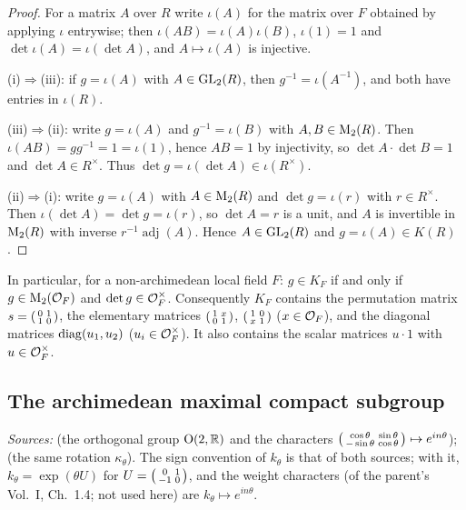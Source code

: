 \begin{lemma}[membership in $K(R)$]
\end{lemma}
\begin{proof}
For a matrix $A$ over $R$ write $\iota(A)$ for the matrix over $F$ obtained by applying $\iota$ entrywise; then
$\iota(AB)=\iota(A)\iota(B)$, $\iota(1)=1$ and $\det\iota(A)=\iota(\det A)$, and $A\mapsto\iota(A)$ is injective.

(i)$\Rightarrow$(iii): if $g=\iota(A)$ with $A\in\mathrm{GL}_2(R)$, then $g^{-1}=\iota(A^{-1})$, and both have entries
in $\iota(R)$.

(iii)$\Rightarrow$(ii): write $g=\iota(A)$ and $g^{-1}=\iota(B)$ with $A,B\in\mathrm{M}_2(R)$. Then
$\iota(AB)=gg^{-1}=1=\iota(1)$, hence $AB=1$ by injectivity, so $\det A\cdot\det B=1$ and $\det A\in R^\times$. Thus
$\det g=\iota(\det A)\in\iota(R^\times)$.

(ii)$\Rightarrow$(i): write $g=\iota(A)$ with $A\in\mathrm{M}_2(R)$ and $\det g=\iota(r)$ with $r\in R^\times$. Then
$\iota(\det A)=\det g=\iota(r)$, so $\det A=r$ is a unit, and $A$ is invertible in $\mathrm{M}_2(R)$ with inverse
$r^{-1}\operatorname{adj}(A)$. Hence $A\in\mathrm{GL}_2(R)$ and $g=\iota(A)\in K(R)$.
\end{proof}
\noindent In particular, for a non-archimedean local field $F$: $g\in K_F$ if and only if $g\in\mathrm{M}_2(\mathcal{O}_F)$ and
$\det g\in\mathcal{O}_F^\times$. Consequently $K_F$ contains the permutation matrix
$s=\begin{psmallmatrix}0&1\\1&0\end{psmallmatrix}$, the elementary matrices
$\begin{psmallmatrix}1&x\\0&1\end{psmallmatrix}$, $\begin{psmallmatrix}1&0\\x&1\end{psmallmatrix}$ ($x\in\mathcal{O}_F$),
and the diagonal matrices $\operatorname{diag}(u_1,u_2)$ ($u_i\in\mathcal{O}_F^\times$). It also contains the scalar matrices $u\cdot1$
with $u\in\mathcal{O}_F^\times$.

\subsection*{The archimedean maximal compact subgroup}

\noindent\emph{Sources:} \cite[§5]{JL} (the orthogonal group $\mathrm{O}(2,\mathbb{R})$ and the characters
$\begin{psmallmatrix}\cos\theta&\sin\theta\\-\sin\theta&\cos\theta\end{psmallmatrix}\mapsto e^{in\theta}$); \cite[§5.2]{GH}
(the same rotation $\kappa_\theta$). The sign convention of $k_\theta$ is that of both sources; with it, $k_\theta=\exp(\theta U)$
for $U=\begin{psmallmatrix}0&1\\-1&0\end{psmallmatrix}$, and the weight characters (of the parent's Vol.~I, Ch.~1.4; not used here) are
$k_\theta\mapsto e^{in\theta}$.

